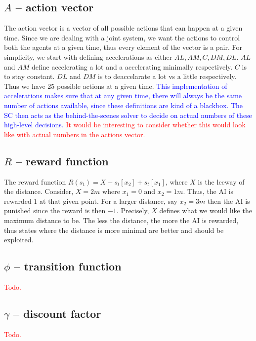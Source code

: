 \documentclass[a4paper,11pt]{article}
\begin{document}
\subsection{$A$ -- action vector}
The action vector is a vector of all possible actions that can happen at a given time. Since we are dealing with a joint system, 
we want the actions to control both the agents at a given time, thus every element of the vector is a pair. For simplicity, we start with defining accelerations as either $AL, AM, C, DM, DL$. 
$AL$ and $AM$ define accelerating a lot and a accelerating minimally respectively. $C$ is to stay constant. $DL$ and $DM$ is to deaccelarate a lot vs a little respectively. 
Thus we have 25 possible actions at a given time. \textcolor{blue}{This implementation of accelerations makes sure that at any given time, there will always be the same number of actions available, since these definitions 
are kind of a blackbox. The SC then acts as the behind-the-scenes solver to decide on actual numbers of these high-level decisions.} \textcolor{red}{It 
would be interesting to consider whether this would look like with actual numbers in the actions vector.}

\subsection{$R$ -- reward function}
The reward function $R(s_t) = X - s_t[x_2] + s_t[x_1]$, where $X$ is the leeway of the distance. Consider, $X = 2m$ where $x_1 = 0$ and $x_2 = 1m$. 
Thus, the AI is rewarded $1$ at that given point. For a larger distance, say $x_2 = 3m$ then the AI is punished since the reward is then $-1$. Precisely, $X$ defines what we would like the maximum distance to be. 
The less the distance, the more the AI is rewarded, thus states where the distance is more minimal are better and should be exploited. 

\subsection{$\phi$ -- transition function}
\textcolor{red}{Todo.}

\subsection{$\gamma$ -- discount factor}
\textcolor{red}{Todo.}
\end{document}
